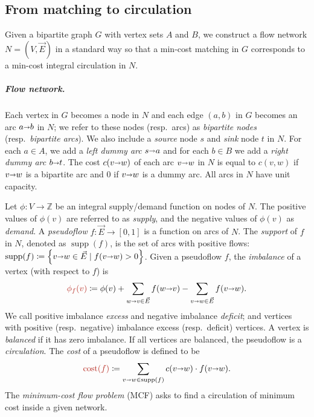 \documentclass[a4paper,UKenglish]{socg-lipics-v2018}
\def\ints{\mathbb{Z}}
\def\Set#1{\left\{ #1 \right\}}
\def\fsupply{\phi}
\def\arcto{\mathord\shortrightarrow}
\def\arc#1#2{#1\arcto#2}
\def\cost{\operatorname{cost}}
\def\supp{\operatorname{supp}}
\theoremstyle{plain}
\numberwithin{figure}{section}
\renewcommand{\paragraph}{\subparagraph}
\def\EMPH#1{\textcolor{BrickRed}{{\emph{#1}}}}
\begin{document}
\subsection{From matching to circulation}
\label{SS:match-flow-red}

Given a bipartite graph $G$ with vertex sets $A$ and $B$, we construct a flow network
$N = (V, \vec{E})$ in a standard way \cite{RT12}
so that a min-cost matching in $G$ corresponds to a min-cost integral
circulation in $N$.

\paragraph{Flow network.}
Each vertex in $G$ becomes a node in $N$ and each edge
$(a, b)$ in $G$ becomes an arc $\arc{a}{b}$ in $N$;
we refer to these nodes (resp.\ arcs) as \EMPH{bipartite nodes} (resp.\ \EMPH{bipartite arcs}).
We also include a \EMPH{source} node $s$ and \EMPH{sink} node $t$ in $N$.
For each $a \in A$, we add a \EMPH{left dummy arc} $\arc{s}{a}$ and for each
$b \in B$ we add a \EMPH{right dummy arc} $\arc{b}{t}$.
The cost $c(\arc{v}{w})$ of each arc $\arc{v}{w}$ in $N$ is equal to $c(v, w)$ if
$\arc{v}{w}$ is a bipartite arc and $0$ if $\arc{v}{w}$ is a dummy arc.
All arcs in $N$ have unit capacity.

Let $\fsupply: V \to \ints$ be an integral supply/demand function on nodes of $N$.
The positive values of $\fsupply(v)$ are referred to as \EMPH{supply}, and the
negative values of $\fsupply(v)$ as \EMPH{demand}.
A \EMPH{pseudoflow} $f: \vec{E} \to [0, 1]$ is a function on arcs of $N$.
The \EMPH{support} of $f$ in $N$, denoted as \EMPH{$\supp(f)$}, is the set of arcs with positive flows:
$\supp(f) \coloneqq \Set{\arc vw \in \vec{E} \mid f(\arc vw) > 0}$.
Given a pseudoflow $f$, the \EMPH{imbalance} of a vertex (with respect to $f$) is
\[
\EMPH{$\fsupply_f (v)$} \coloneqq \fsupply(v) + \sum_{\arc wv \in \vec{E}}{f(\arc wv)} - \sum_{\arc vw \in \vec{E}}{f(\arc vw)}.
\]
We call positive imbalance \EMPH{excess} and negative imbalance \EMPH{deficit};
and vertices with positive (resp.\ negative) imbalance excess (resp.\ deficit) vertices.
A vertex is \EMPH{balanced} if it has zero imbalance.
If all vertices are balanced, the pseudoflow is a \EMPH{circulation}.
The \EMPH{cost} of a pseudoflow is defined to be
\[
 \EMPH{$\cost(f)$} \coloneqq \sum_{\arc vw \in \supp(f)} c(\arc vw) \cdot f(\arc vw).
\]
The \EMPH{minimum-cost flow problem} (MCF) asks to find a circulation of minimum cost inside a given network.
\end{document}

